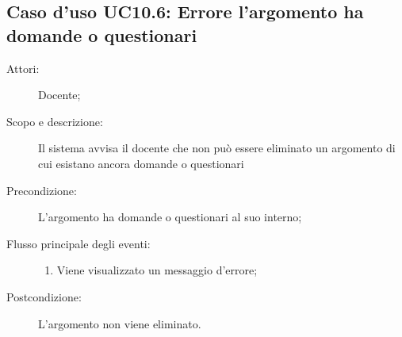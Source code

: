 \subsection{Caso d'uso UC10.6: Errore l'argomento ha domande o questionari}\begin{description}
\item[Attori:] Docente;
\item[Scopo e descrizione:] Il sistema avvisa il docente che non può essere eliminato un argomento di cui esistano ancora domande o questionari
      \item[Precondizione:] L'argomento ha domande o questionari al suo interno;

        \item[Flusso principale degli eventi:] \begin{enumerate}
          \item Viene visualizzato un messaggio d'errore;

      \end{enumerate}
    \item[Postcondizione:] L'argomento non viene eliminato.
  \end{description}
\hypertarget{UC11}{}
